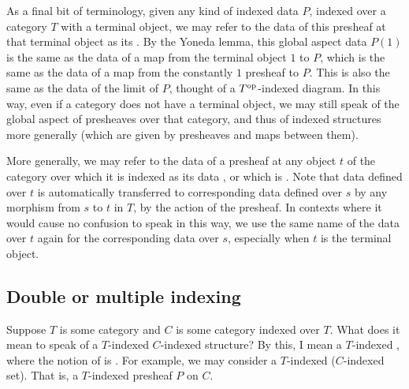 \begin{definition}
As a final bit of terminology, given any kind of indexed data $P$, indexed over a category $T$ with a terminal object, we may refer to the data of this presheaf at that terminal object as its . By the Yoneda lemma, this global aspect data $P(1)$ is the same as the data of a map from the terminal object $1$ to $P$, which is the same as the data of a map from the constantly $1$ presheaf to $P$. This is also the same as the data of the limit of $P$, thought of a $T^{\mathrm{op}}$-indexed diagram. In this way, even if a category does not have a terminal object, we may still speak of the global aspect of presheaves over that category, and thus of indexed structures more generally (which are given by presheaves and maps between them).
\end{definition}


\begin{definition}
More generally, we may refer to the data of a presheaf at any object $t$ of the category over which it is indexed as its data , or which is . Note that data defined over $t$ is automatically transferred to corresponding data defined over $s$ by any morphism from $s$ to $t$ in $T$, by the action of the presheaf. In contexts where it would cause no confusion to speak in this way, we use the same name of the data over $t$ again for the corresponding data over $s$, especially when $t$ is the terminal object.
\end{definition}

\subsection{Double or multiple indexing}

Suppose $T$ is some category and $C$ is some category indexed over $T$. What does it mean to speak of a $T$-indexed $C$-indexed structure? By this, I mean a $T$-indexed , where the notion of  is . For example, we may consider a $T$-indexed ($C$-indexed set). That is, a $T$-indexed presheaf $P$ on $C$.

